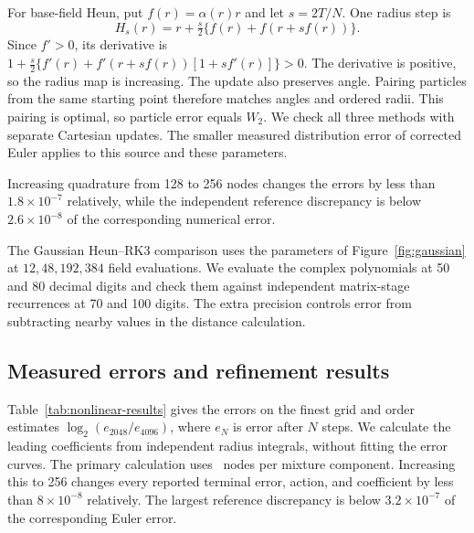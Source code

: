 For base-field Heun, put $f(r)=\alpha(r)r$ and let $s=2T/N$. One radius step is
\[
 H_s(r)=r+\tfrac{s}{2}\{f(r)+f(r+sf(r))\}.
\]
Since $f'>0$, its derivative is
$1+\tfrac{s}{2}\{f'(r)+f'(r+sf(r))[1+sf'(r)]\}>0$.
The derivative is positive, so the radius map is increasing. The update also preserves angle. Pairing particles from the same starting point therefore matches angles and ordered radii. This pairing is optimal, so particle error equals $W_2$. We check all three methods with separate Cartesian updates. The smaller measured distribution error of corrected Euler applies to this source and these parameters.

Increasing quadrature from 128 to 256 nodes changes the errors by less than $1.8\times10^{-7}$ relatively, while the independent reference discrepancy is below $2.6\times10^{-8}$ of the corresponding numerical error.

The Gaussian Heun--RK3 comparison uses the parameters of Figure~\ref{fig:gaussian} at $12,48,192,384$ field evaluations. We evaluate the complex polynomials at 50 and 80 decimal digits and check them against independent matrix-stage recurrences at 70 and 100 digits. The extra precision controls error from subtracting nearby values in the distance calculation.

\subsection{Measured errors and refinement results}

Table~\ref{tab:nonlinear-results} gives the errors on the finest grid and order estimates $\log_2(e_{2048}/e_{4096})$, where $e_N$ is error after $N$ steps. We calculate the leading coefficients from independent radius integrals, without fitting the error curves. The primary calculation uses \NonlinearQuadratureOrder\ nodes per mixture component. Increasing this to 256 changes every reported terminal error, action, and coefficient by less than $8\times10^{-8}$ relatively. The largest reference discrepancy is below $3.2\times10^{-7}$ of the corresponding Euler error.

